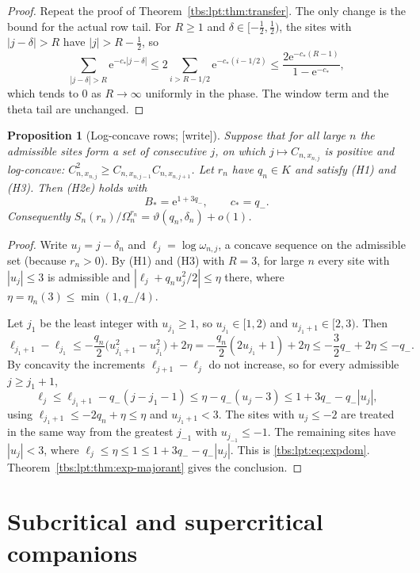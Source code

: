 \documentclass[11pt,a4paper]{article}
\numberwithin{equation}{section}
\newtheorem{proposition}[theorem]{Proposition}
\theoremstyle{definition}
\newcommand{\ee}{\mathrm e}
\begin{document}
\begin{proof}
Repeat the proof of Theorem~\ref{tbs:lpt:thm:transfer}. The only change is
the bound for the actual row tail. For $R\ge1$ and
$\delta\in[-\frac12,\frac12)$, the sites with $|j-\delta|>R$ have
$|j|>R-\frac12$, so
\[
 \sum_{|j-\delta|>R}\ee^{-c_*|j-\delta|}
 \le2\sum_{i>R-1/2}\ee^{-c_*(i-1/2)}
 \le\frac{2\ee^{-c_*(R-1)}}{1-\ee^{-c_*}},
\]
which tends to $0$ as $R\to\infty$ uniformly in the phase. The window
term and the theta tail are unchanged.
\end{proof}

\begin{proposition}[Log-concave rows; {[write]}]\label{tbs:lpt:prop:logconcave}
Suppose that for all large $n$ the admissible sites form a set of
consecutive $j$, on which $j\mapsto C_{n,x_{n,j}}$ is positive and
log-concave:
$C_{n,x_{n,j}}^2\ge C_{n,x_{n,j-1}}C_{n,x_{n,j+1}}$. Let $r_n$ have
$q_n\in K$ and satisfy (H1) and (H3). Then (H2e) holds with
\[
 B_*=\ee^{1+3q_-},\qquad c_*=q_-.
\]
Consequently $S_n(r_n)/\Omega_n^{r_n}=\vartheta(q_n,\delta_n)+o(1)$.
\end{proposition}

\begin{proof}
Write $u_j=j-\delta_n$ and $\ell_j=\log\omega_{n,j}$, a concave sequence on
the admissible set (because $r_n>0$). By (H1) and (H3) with $R=3$, for
large $n$ every site with $|u_j|\le3$ is admissible and
$|\ell_j+q_nu_j^2/2|\le\eta$ there, where $\eta=\eta_n(3)\le\min(1,q_-/4)$.

Let $j_1$ be the least integer with $u_{j_1}\ge1$, so
$u_{j_1}\in[1,2)$ and $u_{j_1+1}\in[2,3)$. Then
\[
 \ell_{j_1+1}-\ell_{j_1}
 \le-\frac{q_n}{2}\bigl(u_{j_1+1}^2-u_{j_1}^2\bigr)+2\eta
 =-\frac{q_n}{2}(2u_{j_1}+1)+2\eta\le-\frac32q_-+2\eta\le-q_-.
\]
By concavity the increments $\ell_{j+1}-\ell_j$ do not increase, so for
every admissible $j\ge j_1+1$,
\[
 \ell_j\le\ell_{j_1+1}-q_-(j-j_1-1)\le\eta-q_-(u_j-3)
 \le1+3q_--q_-|u_j|,
\]
using $\ell_{j_1+1}\le-2q_n+\eta\le\eta$ and $u_{j_1+1}<3$. The sites
with $u_j\le-2$ are treated in the same way from the greatest $j_{-1}$
with $u_{j_{-1}}\le-1$. The remaining sites have $|u_j|<3$, where
$\ell_j\le\eta\le1\le1+3q_--q_-|u_j|$. This is \eqref{tbs:lpt:eq:expdom}.
Theorem~\ref{tbs:lpt:thm:exp-majorant} gives the conclusion.
\end{proof}

\section{Subcritical and supercritical companions}\label{tbs:lpt:sec:companions}
\end{document}
